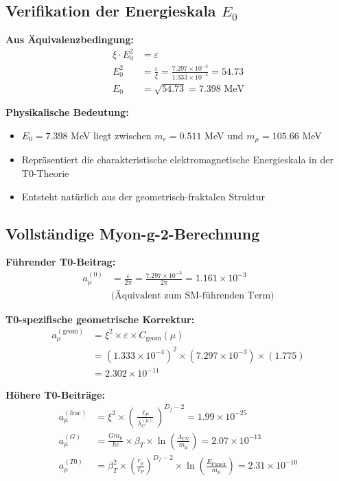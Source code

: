 \documentclass[12pt,a4paper]{article}
\numberwithin{equation}{section}
\newcommand{\xipar}{\xi}
\newcommand{\epsilonT}{\varepsilon}
\newcommand{\Cgeom}{C_{\text{geom}}}
\newcommand{\Df}{D_f}
\newcommand{\Eo}{E_0}
\newcommand{\lP}{\ell_P}
\newcommand{\lambdaC}{\lambda_C}
\begin{document}
	\subsection{Verifikation der Energieskala $\Eo$}
	
	\textbf{Aus Äquivalenzbedingung:}
	\begin{align}
		\xipar \cdot \Eo^2 &= \epsilonT\\
		\Eo^2 &= \frac{\epsilonT}{\xipar} = \frac{7.297 \times 10^{-3}}{1.333 \times 10^{-4}} = 54.73\\
		\Eo &= \sqrt{54.73} = 7.398 \text{ MeV}
		\label{eq:e0_verification}
	\end{align}
	
	\textbf{Physikalische Bedeutung:}
	\begin{itemize}
		\item $\Eo = 7.398$ MeV liegt zwischen $m_e = 0.511$ MeV und $m_\mu = 105.66$ MeV
		\item Repräsentiert die charakteristische elektromagnetische Energieskala in der T0-Theorie
		\item Entsteht natürlich aus der geometrisch-fraktalen Struktur
	\end{itemize}
	
	\subsection{Vollständige Myon-g-2-Berechnung}
	
	\textbf{Führender T0-Beitrag:}
	\begin{align}
		a_\mu^{(0)} &= \frac{\epsilonT}{2\pi} = \frac{7.297 \times 10^{-3}}{2\pi} = 1.161 \times 10^{-3}\\
		&\text{(Äquivalent zum SM-führenden Term)}
		\label{eq:muon_leading}
	\end{align}
	
	\textbf{T0-spezifische geometrische Korrektur:}
	\begin{align}
		a_\mu^{(\text{geom})} &= \xipar^2 \times \epsilonT \times \Cgeom(\mu)\\
		&= (1.333 \times 10^{-4})^2 \times (7.297 \times 10^{-3}) \times (1.775)\\
		&= 2.302 \times 10^{-11}
		\label{eq:muon_geometric}
	\end{align}
	
	\textbf{Höhere T0-Beiträge:}
	\begin{align}
		a_\mu^{(\text{frac})} &= \xipar^2 \times \left(\frac{\lP}{\lambdaC^{(\mu)}}\right)^{\Df-2} = 1.99 \times 10^{-25}\\
		a_\mu^{(G)} &= \frac{G m_\mu}{\hbar c} \times \beta_T \times \ln\left(\frac{\Lambda_{\text{UV}}}{m_\mu}\right) = 2.07 \times 10^{-13}\\
		a_\mu^{(T0)} &= \beta_T^2 \times \left(\frac{r_\mu}{\lP}\right)^{\Df-2} \times \ln\left(\frac{E_{\text{Planck}}}{m_\mu}\right) = 2.31 \times 10^{-10}
		\label{eq:muon_higher_order}
	\end{align}
	
\end{document}
